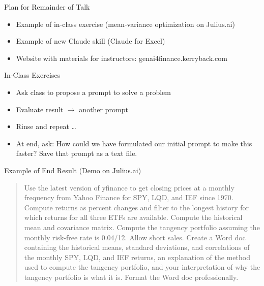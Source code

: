\documentclass{beamer}
\begin{document}

\begin{frame}{Plan for Remainder of Talk}
    \begin{itemize}
     \item Example of in-class exercise (mean-variance optimization on Julius.ai)
     \item Example of new Claude skill (Claude for Excel)
     \item Website with materials for instructors: genai4finance.kerryback.com
    \end{itemize}
\end{frame}

\begin{frame}{In-Class Exercises}
    \begin{itemize}
    \item Ask class to propose a prompt to solve a problem 
    \pause
    \item Evaluate result $\rightarrow$ another prompt
    \item Rinse and repeat \ldots
    \pause
    \item At end, ask: \alert{How could we have formulated our initial prompt to make this faster?}  Save that prompt as a text file.
    \end{itemize}
\end{frame}

\begin{frame}{Example of End Result (Demo on Julius.ai)}
   \begin{quote}
Use the latest version of yfinance to get closing prices at a monthly frequency from Yahoo Finance for SPY, LQD, and IEF since 1970. Compute returns as percent changes and filter to the longest history for which returns for all three ETFs are available. Compute the historical mean and covariance matrix. Compute the tangency portfolio assuming the monthly risk-free rate is 0.04/12.  Allow short sales.  Create a Word doc containing the historical means, standard deviations, and correlations of the monthly SPY, LQD, and IEF returns, an explanation of the method used to compute the tangency portfolio, and your interpretation of why the tangency portfolio is what it is.  Format the Word doc professionally.
  \end{quote}
\end{frame}
\end{document}
